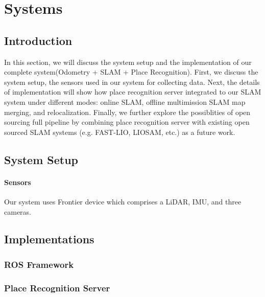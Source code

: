 \chapter{Systems}
\label{ch:system}
\section{Introduction}
In this section, we will discuss the system setup and the implementation of our complete system(Odometry + SLAM + Place Recognition). First, we discuss the system setup, the sensors used in our system for collecting data. Next, the details of implementation will show how place recognition server integrated to our SLAM system under different modes: online SLAM, offline multimission SLAM map merging, and relocalization. Finally, we further explore the possiblities of open sourcing full pipeline by combining place recognition server with existing open sourced SLAM systems (e.g. FAST-LIO, LIOSAM, etc.) as a future work. 

\section{System Setup}
\label{sec:system_setup}

\subsubsection*{Sensors}
Our system uses Frontier device which comprises a LiDAR, IMU, and three cameras.




\section{Implementations}
\label{sec:implementation}
\subsection*{ROS Framework}

\subsection*{Place Recognition Server}
